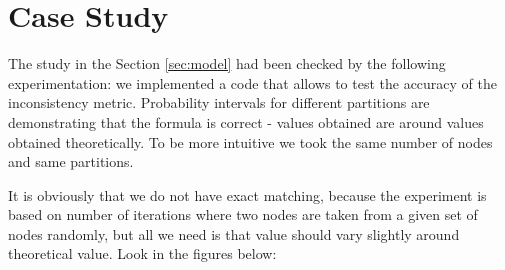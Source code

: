 \documentclass[a4paper,14pt]{llncs}
\begin{document}
\section{Case Study}\label{sec:experiments}

The study in the Section \ref{sec:model} had been checked by the following experimentation: 
we implemented a code that allows to test the accuracy of the inconsistency metric. Probability intervals for different partitions are demonstrating that the formula is correct - values obtained are around values obtained theoretically. To be more intuitive we took the same number of nodes and same partitions.

It is obviously that we do not have exact matching, because the experiment is based on number of iterations where two nodes are taken from a given set of nodes randomly, but all we need is that value should vary slightly around theoretical value. Look in the figures below:
%
\end{document}
